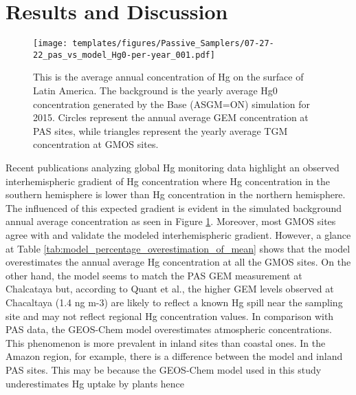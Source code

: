 \section{Results and Discussion}\label{c2_results}
\begin{figure}[H]
\centering
  \texttt{[image: templates/figures/Passive\_Samplers/07-27-22\_pas\_vs\_model\_Hg0-per-year\_001.pdf]}
  \caption{This is the average annual concentration of Hg on the surface of Latin America. The background is the yearly average Hg0 concentration generated by the Base (ASGM=ON) simulation for 2015. Circles represent the annual average GEM concentration at PAS sites, while triangles represent the yearly average TGM concentration at GMOS sites\cite{quant_measuring_2021,sprovieri_atmospheric_2016,koenig_seasonal_2021}.}
  \label{fig:06-12-22_pas_vs_model_Hg0-per-year_001}
  
  
\end{figure}
\FloatBarrier
\begin{flushleft}
 Recent publications analyzing global Hg monitoring data highlight an observed interhemispheric gradient of Hg concentration where Hg concentration in the southern hemisphere is lower than Hg concentration in the northern hemisphere\cite{sprovieri_atmospheric_2016}. The influenced of this expected gradient is evident in the simulated background annual average \hg concentration as seen in Figure \ref{fig:06-12-22_pas_vs_model_Hg0-per-year_001}. Moreover, most GMOS sites agree with and validate the modeled interhemispheric gradient. However, a glance at Table \ref{tab:model_percentage_overestimation_of_mean} shows that the model overestimates the annual average Hg concentration at all the GMOS sites. On the other hand, the model seems to match the PAS GEM measurement at Chalcataya but, according to Quant et al.\cite{quant_measuring_2021}, the higher GEM levels observed at Chacaltaya (1.4 ng m-3) are likely to reflect a known Hg spill near the sampling site and may not reflect regional Hg concentration values. In comparison with PAS data, the GEOS-Chem model overestimates atmospheric concentrations. This phenomenon is more prevalent in inland sites than coastal ones. In the Amazon region, for example, there is a difference between the model and inland PAS sites. This may be because the GEOS-Chem model used in this study underestimates Hg uptake by plants \cite{feinberg_evaluating_2022} hence 
\end{flushleft}

